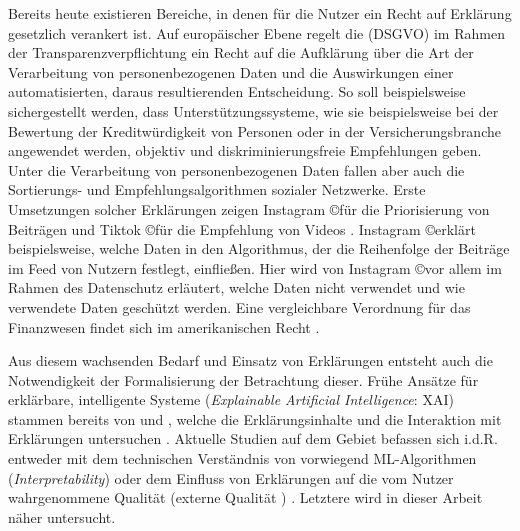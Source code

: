Bereits heute existieren Bereiche, in denen für die Nutzer ein \glqq Recht auf Erklärung\grqq{} gesetzlich verankert ist. Auf europäischer Ebene regelt die  (DSGVO) \cite{eu_verordnung_2016} im Rahmen der Transparenzverpflichtung ein Recht auf die Aufklärung über die Art der Verarbeitung von personenbezogenen Daten und die Auswirkungen einer automatisierten, daraus resultierenden Entscheidung. So soll beispielsweise sichergestellt werden, dass Unterstützungssysteme, wie sie beispielsweise bei der Bewertung der Kreditwürdigkeit von Personen oder in der Versicherungsbranche angewendet werden, objektiv und diskriminierungsfreie Empfehlungen geben. Unter die Verarbeitung von personenbezogenen Daten fallen aber auch die Sortierungs- und Empfehlungsalgorithmen sozialer Netzwerke. Erste Umsetzungen solcher Erklärungen zeigen Instagram \copyright für die Priorisierung von Beiträgen und Tiktok \copyright für die Empfehlung von Videos \cite{mosseri_shedding_2021,tiktok_technology_limited_how_2021}. Instagram \copyright erklärt beispielsweise, welche Daten in den Algorithmus, der die Reihenfolge der Beiträge im Feed von Nutzern festlegt, einfließen. Hier wird von Instagram \copyright vor allem im Rahmen des Datenschutz erläutert, welche Daten nicht verwendet und wie verwendete Daten geschützt werden. Eine vergleichbare Verordnung für das Finanzwesen findet sich im amerikanischen Recht \cite{cfpb_regulation_2018}.

Aus diesem wachsenden Bedarf und Einsatz von Erklärungen entsteht auch die Notwendigkeit der Formalisierung der Betrachtung dieser. Frühe Ansätze für erklärbare, intelligente Systeme (\textit{Explainable Artificial Intelligence}: XAI) stammen bereits von \citeauthor{byrne1991construction} und \citeauthor{cawsey1991generating}, welche die Erklärungsinhalte \cite{byrne1991construction} und die Interaktion mit Erklärungen untersuchen \cite{cawsey1991generating}. Aktuelle Studien auf dem Gebiet befassen sich i.d.R. entweder mit dem technischen Verständnis von vorwiegend ML-Algorithmen (\textit{Interpretability}) \cite{gilpin_explaining_2018, fong_interpretable_2017, samek_towards_2019} oder dem Einfluss von Erklärungen auf die vom Nutzer wahrgenommene Qualität (externe Qualität \cite{international2011iso}) \cite{nunes_systematic_2017,kouki_user_2017,chazette_end-users_nodate}. Letztere wird in dieser Arbeit näher untersucht.


